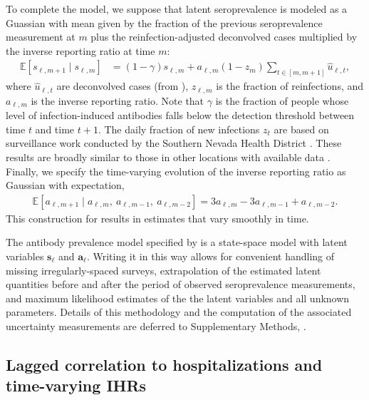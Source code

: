 To complete the model, we suppose that latent seroprevalence is modeled as a
Guassian with mean given by the fraction of the previous seroprevalence
measurement at $m$ plus the reinfection-adjusted deconvolved cases multiplied by
the inverse reporting ratio at time $m$:
\begin{align}
  \label{eq:expect-sero}
\mathbb{E}[s_{\ell,m+1} \mid s_{\ell,m}] & = (1 -\gamma) s_{\ell,m} 
+ a_{\ell,m} (1 - z_{m}) \sum_{t\in[m,m+1]}\widehat{u}_{\ell,t},
\end{align}
where $\widehat{u}_{\ell,t}$ are deconvolved cases (from
), $z_{\ell,m}$ is the fraction of reinfections, and
$a_{\ell,m}$ is the inverse reporting ratio. Note that $\gamma$ is the fraction
of people whose level of infection-induced antibodies falls below the detection
threshold between time $t$ and time $t+1$. The daily fraction of new infections
$z_t$ are based on surveillance work conducted by the Southern Nevada Health
District \citep{ruff2022rapid}. These results are broadly similar to those in
other locations with available data  \citep{ruff2022rapid, nyreinfect2021,
hireinfect2022, wareinfect2022}. Finally, we specify the time-varying evolution
of the inverse reporting ratio as Gaussian with expectation,
\begin{align}
  \label{eq:report-ratio}
\mathbb{E}[a_{\ell,m+1} \mid a_{\ell,m},\ a_{\ell,m-1},\ a_{\ell,m-2}] = 3a_{\ell,m} - 3a_{\ell,m-1} + a_{\ell,m-2}.
\end{align}
This construction for  results in estimates that vary
smoothly in time.

    
The antibody prevalence model specified by
 is a state-space model with
latent variables $\mathbf{s}_{\ell}$ and $\mathbf{a}_{\ell}$. Writing it in this
way allows for convenient handling of missing irregularly-spaced surveys,
extrapolation of the estimated latent quantities before and after the period of
observed seroprevalence measurements, and maximum likelihood estimates of the
the latent variables and all unknown parameters. Details of this methodology and
the computation of the associated uncertainty measurements are deferred to
Supplementary Methods, .



\subsection{Lagged correlation to hospitalizations and time-varying IHRs} 
\label{sec:ihr-calculations}

